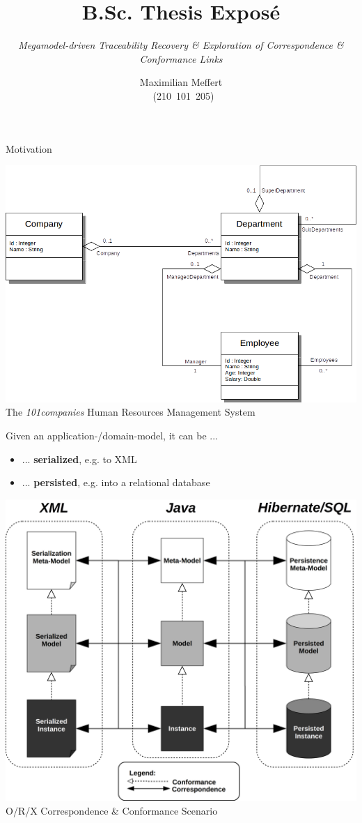 \documentclass{beamer}
\title{B.Sc. Thesis Exposé}
\subtitle{\it Megamodel-driven Traceability Recovery \& Exploration of Correspondence \& Conformance Links}
\author{Maximilian Meffert\\~(210~101~205)}
\institute{University of Koblenz-Landau}
\date{}
\begin{document}
\frame{\titlepage}


\begin{frame}{Motivation}

\begin{center}
\includegraphics[width=.6\textwidth]{companies.png}
\newline
\scriptsize
The \textit{101companies} Human Resources Management System
\end{center}
Given an application-/domain-model, it can be ...
\begin{itemize}
\item ... \textbf{serialized}, e.g. to XML
\item ... \textbf{persisted}, e.g. into a relational database
\end{itemize}

\newpage

\begin{center}
\includegraphics[width=.7\textwidth]{orx-cc-scenario.png}
\newline
O/R/X Correspondence \& Conformance Scenario
\end{center}

\newpage


\end{frame}
\end{document}

